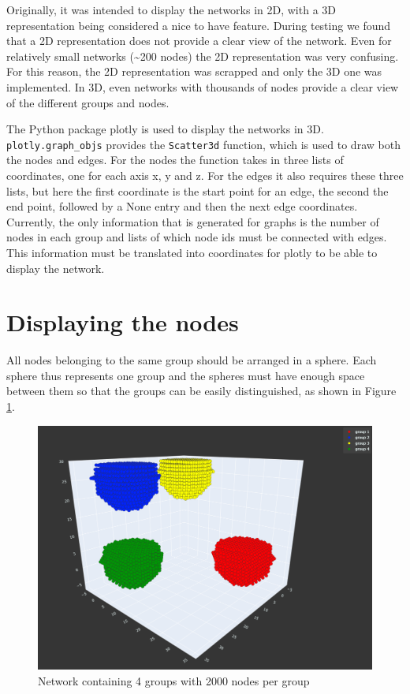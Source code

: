 Originally, it was intended to display the networks in 2D, with a 3D representation being considered a nice to have feature. During testing we found that a 2D representation does not provide a clear view of the network. Even for relatively small networks (\textasciitilde 200 nodes) the 2D representation was very confusing. For this reason, the 2D representation was scrapped and only the 3D one was implemented. In 3D, even networks with thousands of nodes provide a clear view of the different groups and nodes.
\newline

The Python package plotly \cite{plotly} is used to display the networks in 3D. \texttt{plotly.graph\_objs} provides the \texttt{Scatter3d} function, which is used to draw both the nodes and edges. For the nodes the function takes in three lists of coordinates, one for each axis x, y and z. For the edges it also requires these three lists, but here the first coordinate is the start point for an edge, the second the end point, followed by a None entry and then the next edge coordinates. Currently, the only information that is generated for graphs is the number of nodes in each group and lists of which node ids must be connected with edges. This information must be translated into coordinates for plotly to be able to display the network.

\section{Displaying the nodes}
\label{sub:displayNodes}
All nodes belonging to the same group should be arranged in a sphere. Each sphere thus represents one group and the spheres must have enough space between them so that the groups can be easily distinguished, as shown in Figure \ref{fig:groups}.

\begin{figure}
    \centering
    \includegraphics[width=0.75\linewidth]{images/groups.png}
    \caption{Network containing 4 groups with 2000 nodes per group}
    \label{fig:groups}
\end{figure}

